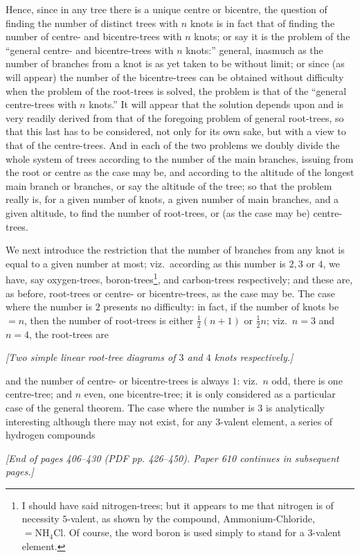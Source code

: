 \documentclass[11pt,a4paper]{article}
\begin{document}
Hence, since in any tree there is a unique centre or bicentre, the question of finding the number of distinct trees with $n$ knots is in fact that of finding the number of centre- and bicentre-trees with $n$ knots; or say it is the problem of the ``general centre- and bicentre-trees with $n$ knots:'' general, inasmuch as the number of branches from a knot is as yet taken to be without limit; or since (as will appear) the number of the bicentre-trees can be obtained without difficulty when the problem of the root-trees is solved, the problem is that of the ``general centre-trees with $n$ knots.'' It will appear that the solution depends upon and is very readily derived from that of the foregoing problem of general root-trees, so that this last has to be considered, not only for its own sake, but with a view to that of the centre-trees. And in each of the two problems we doubly divide the whole system of trees according to the number of the main branches, issuing from the root or centre as the case may be, and according to the altitude of the longest main branch or branches, or say the altitude of the tree; so that the problem really is, for a given number of knots, a given number of main branches, and a given altitude, to find the number of root-trees, or (as the case may be) centre-trees.

We next introduce the restriction that the number of branches from any knot is equal to a given number at most; viz.\ according as this number is $2,3$ or $4$, we have, say oxygen-trees, boron-trees\footnote{I should have said nitrogen-trees; but it appears to me that nitrogen is of necessity $5$-valent, as shown by the compound, Ammonium-Chloride, $= \mathrm{NH}_{4}\mathrm{Cl}$. Of course, the word boron is used simply to stand for a $3$-valent element.}, and carbon-trees respectively; and these are, as before, root-trees or centre- or bicentre-trees, as the case may be. The case where the number is $2$ presents no difficulty: in fact, if the number of knots be $= n$, then the number of root-trees is either $\tfrac{1}{2}(n+1)$ or $\tfrac{1}{2}n$; viz.\ $n = 3$ and $n = 4$, the root-trees are

\begin{center}
\textit{[Two simple linear root-tree diagrams of $3$ and $4$ knots respectively.]}
\end{center}

and the number of centre- or bicentre-trees is always $1$: viz.\ $n$ odd, there is one centre-tree; and $n$ even, one bicentre-tree; it is only considered as a particular case of the general theorem. The case where the number is $3$ is analytically interesting although there may not exist, for any $3$-valent element, a series of hydrogen compounds

\bigskip
\textit{[End of pages 406--430 (PDF pp. 426--450). Paper 610 continues in subsequent pages.]}
\end{document}
